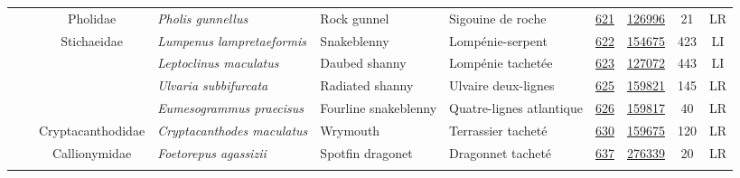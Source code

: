 \documentclass[12pt]{article}\usepackage[]{graphicx}\usepackage[]{color}
\begin{document}
\begin{landscapepage}
\begin{longtable}[t]{ccc>{\centering\arraybackslash}p{3cm}>{\centering\arraybackslash}p{3cm}>{\centering\arraybackslash}p{3cm}>{}c>{}ccc}
\nopagebreak
\hspace{1em}\hspace{1em} &  & Pholidae & \em{Pholis gunnellus} & Rock gunnel & Sigouine de roche & \href{#sec:621}{621} & \href{http://www.marinespecies.org/aphia.php?p=taxdetails&id=126996}{126996} & 21 & LR\\
\nopagebreak
\hspace{1em}\hspace{1em} &  & Stichaeidae & \em{Lumpenus lampretaeformis} & Snakeblenny & Lompénie-serpent & \href{#sec:622}{622} & \href{http://www.marinespecies.org/aphia.php?p=taxdetails&id=154675}{154675} & 423 & LI\\
\nopagebreak
\hspace{1em}\hspace{1em} &  &  & \em{Leptoclinus maculatus} & Daubed shanny & Lompénie tachetée & \href{#sec:623}{623} & \href{http://www.marinespecies.org/aphia.php?p=taxdetails&id=127072}{127072} & 443 & LI\\
\nopagebreak
\hspace{1em}\hspace{1em} &  &  & \em{Ulvaria subbifurcata} & Radiated shanny & Ulvaire deux-lignes & \href{#sec:625}{625} & \href{http://www.marinespecies.org/aphia.php?p=taxdetails&id=159821}{159821} & 145 & LR\\
\nopagebreak
\hspace{1em}\hspace{1em} &  &  & \em{Eumesogrammus praecisus} & Fourline snakeblenny & Quatre-lignes atlantique & \href{#sec:626}{626} & \href{http://www.marinespecies.org/aphia.php?p=taxdetails&id=159817}{159817} & 40 & LR\\
\nopagebreak
\hspace{1em}\hspace{1em} &  & Cryptacanthodidae & \em{Cryptacanthodes maculatus} & Wrymouth & Terrassier tacheté & \href{#sec:630}{630} & \href{http://www.marinespecies.org/aphia.php?p=taxdetails&id=159675}{159675} & 120 & LR\\
\nopagebreak
\hspace{1em}\hspace{1em} &  & Callionymidae & \em{Foetorepus agassizii} & Spotfin dragonet & Dragonnet tacheté & \href{#sec:637}{637} & \href{http://www.marinespecies.org/aphia.php?p=taxdetails&id=276339}{276339} & 20 & LR\\
\nopagebreak

\end{longtable}
\end{landscapepage}
\end{document}
